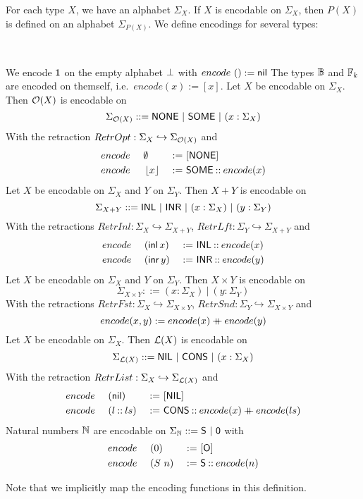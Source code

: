 For each type $X$, we have an alphabet $\Sigma_X$.  If $X$ is encodable on $\Sigma_X$, then $P(X)$ is defined on an alphabet $\Sigma_{P(X)}$.  We
define encodings for several types:
\begin{definition}
  \label{def:basic-encodings}
  ~
  \begin{enumerate}
   We encode $\mathsf{1}$ on the empty alphabet $\bot$ with $encode~\mathsf{()} := \mathsf{nil}$
   The types $\mathbb{B}$ and $\mathbb{F}_k$ are encoded on themself, i.e.\ $encode(x):=[x]$.
   Let $X$ be encodable on $\Sigma_X$.  Then $\mathcal{O}(X)$ is encodable on
    \[ \Sigma_{\mathcal{O}(X)} ::= \mathsf{NONE} ~|~ \mathsf{SOME} ~|~ (x:\Sigma_X) \]
    With the retraction $RetrOpt : \Sigma_X \hookrightarrow \Sigma_{\mathcal{O}(X)}$ and
    \begin{alignat*}{3}
      &encode~&&\emptyset  &~:=~& [\mathsf{NONE}] \\
      &encode~&&\left\lfloor {x} \right\rfloor&~:=~& \mathsf{SOME} \mathbin{::} encode(x)
    \end{alignat*}
   Let $X$ be encodable on $\Sigma_X$ and $Y$ on $\Sigma_Y$.  Then $X+Y$ is encodable on
    \[ \Sigma_{X+Y} ::= \mathsf{INL} ~|~ \mathsf{INR} ~|~ (x:\Sigma_X) ~|~ (y:\Sigma_Y) \] With the retractions
    $RetrInl : \Sigma_X \hookrightarrow \Sigma_{X+Y}$, $RetrLft : \Sigma_Y \hookrightarrow \Sigma_{X+Y}$ and
    \begin{alignat*}{3}
      &encode~&&(\operatorname{\mathsf{inl}} x)&~:=~& \mathsf{INL} \mathbin{::} encode(x) \\
      &encode~&&(\operatorname{\mathsf{inr}} y)&~:=~& \mathsf{INR} \mathbin{::} encode(y)
    \end{alignat*}
   Let $X$ be encodable on $\Sigma_X$ and $Y$ on $\Sigma_Y$.  Then $X \times Y$ is encodable on
    \[ \Sigma_{X \times Y} ::= (x:\Sigma_X) ~|~ (y:\Sigma_Y) \] With the retractions
    $RetrFst : \Sigma_X \hookrightarrow \Sigma_{X \times Y}$, $RetrSnd : \Sigma_Y \hookrightarrow \Sigma_{X \times Y}$ and
    \[
      encode(x,y) := encode(x) \mathbin{+\mkern-10mu+} encode(y)
    \]
   Let $X$ be encodable on $\Sigma_X$.  Then $\mathcal{L}(X)$ is encodable on
    \[ \Sigma_{\mathcal{L}(X)} ::= \mathsf{NIL} ~|~ \mathsf{CONS} ~|~ (x:\Sigma_X) \]
    With the retraction $RetrList : \Sigma_X \hookrightarrow \Sigma_{\mathcal{L}(X)}$ and
    \begin{alignat*}{3}
      &encode~&&(\mathsf{nil}      ) &~:=~& [\mathsf{NIL}] \\
      &encode~&&(l \mathbin{::} ls) &~:=~& \mathsf{CONS} \mathbin{::} encode(x) \mathbin{+\mkern-10mu+} encode(ls)
    \end{alignat*}
   Natural numbers $\mathbb{N}$ are encodable on $\Sigma_{\mathbb{N}} ::= \mathsf{S} ~|~ \mathsf{0} $ with
    \begin{alignat*}{3}
      &encode~&&(0  ) &~:=~& [\mathsf{O}] \\
      &encode~&&(S~n) &~:=~& \mathsf{S} \mathbin{::} encode(n)
    \end{alignat*}
  \end{enumerate}
  Note that we implicitly map the encoding functions in this definition.
\end{definition}

